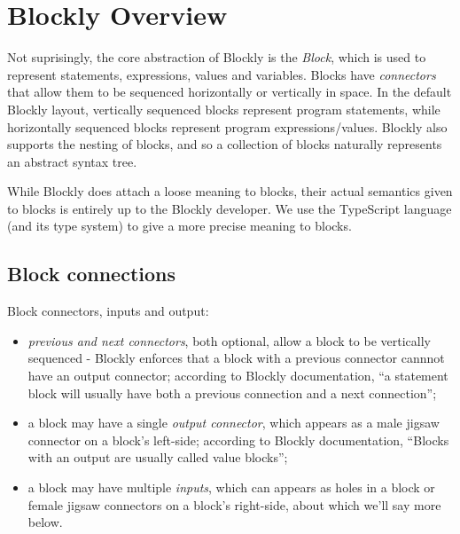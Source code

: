 \section{Blockly Overview}
\label{sec:blockly}

Not suprisingly, the core abstraction of Blockly is the \emph{Block},
which is used to represent statements, expressions, values and variables.  
Blocks have \emph{connectors} that allow them to be sequenced
horizontally or vertically in space.  In the default Blockly
layout, vertically sequenced blocks
represent program statements, while horizontally
sequenced blocks represent program expressions/values.
Blockly also supports the nesting of blocks, and so a collection of
blocks naturally represents an abstract syntax tree. 

While Blockly does attach a loose meaning to blocks,
their actual semantics given to blocks is entirely up to the Blockly developer.
We use the TypeScript language (and its type system) to 
give a more precise meaning to blocks. 

\subsection{Block connections}

Block connectors, inputs and output:
\begin{itemize}


\item \emph{previous and next connectors}, both optional, allow a block to be vertically sequenced - Blockly
  enforces that a block with a previous connector cannnot have an output connector; according
  to Blockly documentation, ``a statement block will usually have both a previous connection and 
  a next connection'';

\item a block may have a single \emph{output connector}, 
      which appears as a male jigsaw connector on a block's left-side; according to 
      Blockly documentation, ``Blocks with an output are usually called value blocks'';

\item a block may have multiple \emph{inputs}, which can appears as holes in a block
      or female jigsaw connectors on a block's right-side, about which we'll say more below. 
\end{itemize}

